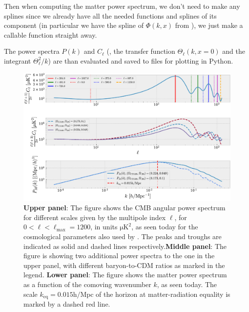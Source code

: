 \documentclass[twocolumn]{aastex62}
\begin{document}
Then when computing the matter power spectrum, we don't need to make any splines since we already have all the needed functions and splines of its component (in particular we have the spline of $\Phi(k, x)$ from \cite{stutzer:2020c}), we just make a callable function straight away. 

The power spectra $P(k)$ and $C_\ell$ (, the transfer function $\Theta_\ell(k, x = 0)$ and the integrant $\Theta_\ell^2 / k$) are than evaluated and saved to files for plotting in Python.

\begin{figure}
    \includegraphics[scale = 0.65]{Figures/Cell.pdf}
    \caption{\textbf{Upper panel}: The figure shows the CMB angular power spectrum for different scales given by the multipole index $\ell$, for $0 < \ell < \ell_\text{max} = 1200$, in units $\mathrm{\mu K}^2$, as seen today for the cosmological parameters also used by \cite{stutzer:2020a,stutzer:2020b,stutzer:2020c}. The peaks and troughs are indicated as solid and dashed lines respectively.\textbf{Middle panel}: The figure is showing two additional power spectra to the one in the upper panel, with different baryon-to-CDM ratios as marked in the legend.  \textbf{Lower panel}: The figure shows the matter power spectrum as a function of the comoving wavenumber $k$, as seen today. The scale $k_\text{eq} = 0.015 \mathrm{h / Mpc}$ of the horizon at matter-radiation equality is marked by a dashed red line.} 
    \label{fig:Cell}
\end{figure}
\end{document}

